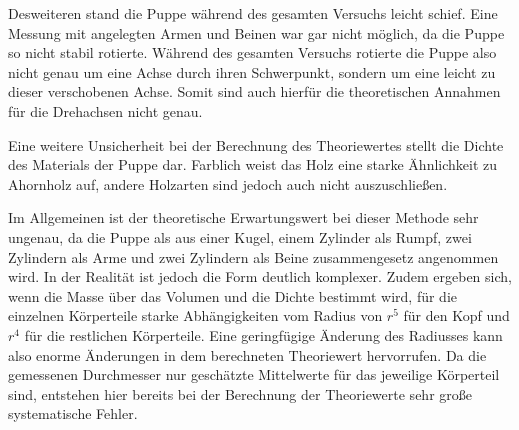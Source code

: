 Desweiteren stand die Puppe während des gesamten Versuchs leicht schief. Eine Messung mit
angelegten Armen und Beinen war gar nicht möglich, da die Puppe so nicht stabil rotierte.
Während des gesamten Versuchs rotierte die Puppe also nicht genau um eine Achse durch
ihren Schwerpunkt, sondern um eine leicht zu dieser verschobenen Achse.
Somit sind auch hierfür die theoretischen Annahmen für die Drehachsen nicht genau.

Eine weitere Unsicherheit bei der Berechnung des Theoriewertes stellt die Dichte
des Materials der Puppe dar. Farblich weist das Holz eine starke Ähnlichkeit zu
Ahornholz auf, andere Holzarten sind jedoch auch nicht auszuschließen.

Im Allgemeinen ist der theoretische Erwartungswert bei dieser Methode sehr ungenau,
da die Puppe als aus einer Kugel, einem Zylinder als Rumpf, zwei Zylindern als Arme
und zwei Zylindern als Beine zusammengesetz angenommen wird. In der Realität ist jedoch die Form deutlich
komplexer. Zudem ergeben sich, wenn die Masse über das Volumen und die Dichte bestimmt wird,
für die einzelnen Körperteile starke Abhängigkeiten vom Radius von $r^5$ für den Kopf
und $r^4$ für die restlichen Körperteile. Eine geringfügige Änderung des Radiusses
kann also enorme Änderungen in dem berechneten Theoriewert hervorrufen. Da die gemessenen
Durchmesser nur geschätzte Mittelwerte für das jeweilige Körperteil sind, entstehen
hier bereits bei der Berechnung der Theoriewerte sehr große systematische Fehler.
